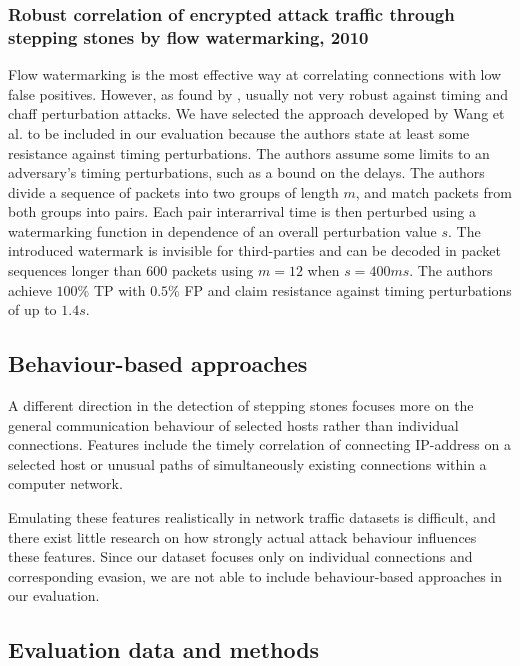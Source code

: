 \documentclass[runningheads]{llncs}\usepackage[]{graphicx}\usepackage[]{color}
\begin{document}
\subsubsection{Robust correlation of encrypted attack traffic through stepping stones by flow watermarking, 2010}
Flow watermarking is the most effective way at correlating connections with low false positives. However, as found by \cite{iacovazzi2016network}, usually not very robust against timing and chaff perturbation attacks. We have selected the approach developed by Wang et al. \cite{wang2010robust} to be included in our evaluation because the authors state at least some resistance against timing perturbations. The authors assume some limits to an adversary's  timing perturbations, such as a bound on the delays. The authors divide a sequence of packets into two groups of length $m$, and match packets from both groups into pairs. Each pair interarrival time is then perturbed using a watermarking function in dependence of an overall perturbation value $s$. 
The introduced watermark is invisible for third-parties and can be decoded in packet sequences longer than 600 packets using $m=12$ when $s=400ms$.  The authors achieve $100\%$ TP with $0.5\%$ FP and claim resistance against timing perturbations of up to $1.4s$.




\subsection{Behaviour-based approaches}

A different direction in the detection of stepping stones focuses more on the general communication behaviour of selected hosts rather than individual connections. Features include the timely correlation of connecting IP-address on a selected host or unusual paths of simultaneously existing connections within a computer network.

Emulating these features realistically in network traffic datasets is difficult, and there exist little research on how strongly actual attack behaviour influences these features. Since our dataset focuses only on individual connections and corresponding evasion, we are not able to include behaviour-based approaches in our evaluation.



\subsection{Evaluation data and methods}\label{Sec:Evaldata}
\end{document}
